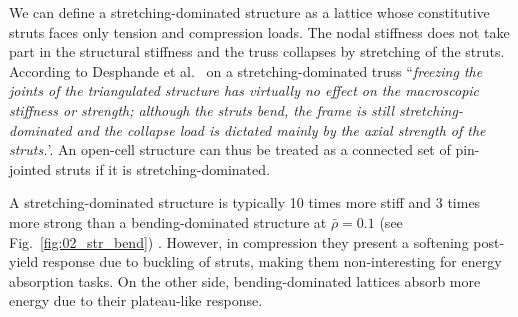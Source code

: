 We can define a stretching-dominated structure as a lattice whose constitutive struts faces only tension and compression loads. The nodal stiffness does not take part in the structural stiffness and the truss collapses by stretching of the struts. According to Desphande et al.~ on a stretching-dominated truss ``\textit{freezing the joints of the triangulated structure has virtually no effect on the macroscopic stiffness or strength; although the struts bend, the frame is still stretching-dominated and the collapse load is dictated mainly by the axial strength of the struts.}'. An open-cell structure can thus be treated as a connected set of pin-jointed struts if it is stretching-dominated.

A stretching-dominated structure is typically 10 times more stiff and 3 times more strong than a bending-dominated structure at $\bar{\rho} = 0.1$ (see Fig.~\ref{fig:02_str_bend}) . However, in compression they present a softening post-yield response due to buckling of struts, making them non-interesting for energy absorption tasks. On the other side, bending-dominated lattices absorb more energy due to their plateau-like response.

